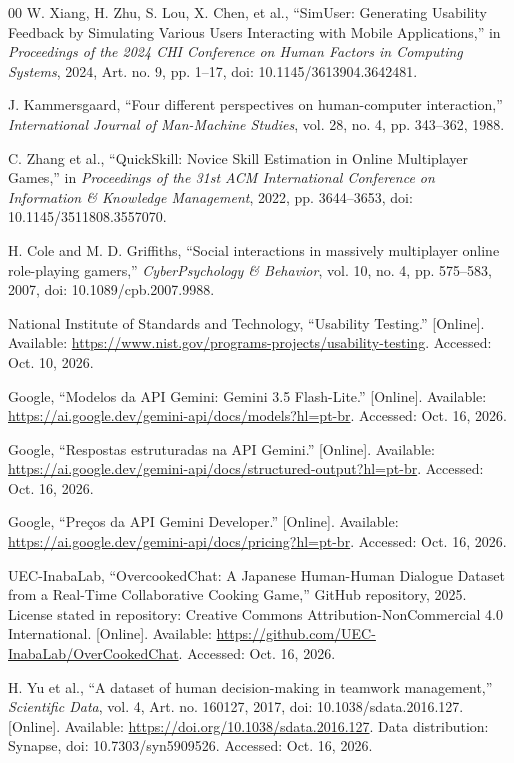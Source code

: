 \documentclass[conference]{IEEEtran}
\begin{document}
\begin{thebibliography}{00}
W. Xiang, H. Zhu, S. Lou, X. Chen, et al., ``SimUser: Generating Usability Feedback by Simulating Various Users Interacting with Mobile Applications,'' in \textit{Proceedings of the 2024 CHI Conference on Human Factors in Computing Systems}, 2024, Art. no. 9, pp. 1--17, doi: 10.1145/3613904.3642481.

J. Kammersgaard, ``Four different perspectives on human-computer interaction,'' \textit{International Journal of Man-Machine Studies}, vol. 28, no. 4, pp. 343--362, 1988.


C. Zhang et al., ``QuickSkill: Novice Skill Estimation in Online Multiplayer Games,'' in \textit{Proceedings of the 31st ACM International Conference on Information \& Knowledge Management}, 2022, pp. 3644--3653, doi: 10.1145/3511808.3557070.

H. Cole and M. D. Griffiths, ``Social interactions in massively multiplayer online role-playing gamers,'' \textit{CyberPsychology \& Behavior}, vol. 10, no. 4, pp. 575--583, 2007, doi: 10.1089/cpb.2007.9988.

National Institute of Standards and Technology, ``Usability Testing.'' [Online]. Available: \url{https://www.nist.gov/programs-projects/usability-testing}. Accessed: Oct. 10, 2026.

Google, ``Modelos da API Gemini: Gemini 3.5 Flash-Lite.'' [Online]. Available: \url{https://ai.google.dev/gemini-api/docs/models?hl=pt-br}. Accessed: Oct. 16, 2026.

Google, ``Respostas estruturadas na API Gemini.'' [Online]. Available: \url{https://ai.google.dev/gemini-api/docs/structured-output?hl=pt-br}. Accessed: Oct. 16, 2026.

Google, ``Preços da API Gemini Developer.'' [Online]. Available: \url{https://ai.google.dev/gemini-api/docs/pricing?hl=pt-br}. Accessed: Oct. 16, 2026.

UEC-InabaLab, ``OvercookedChat: A Japanese Human-Human Dialogue Dataset from a Real-Time Collaborative Cooking Game,'' GitHub repository, 2025. License stated in repository: Creative Commons Attribution-NonCommercial 4.0 International. [Online]. Available: \url{https://github.com/UEC-InabaLab/OverCookedChat}. Accessed: Oct. 16, 2026.

H. Yu et al., ``A dataset of human decision-making in teamwork management,'' \textit{Scientific Data}, vol. 4, Art. no. 160127, 2017, doi: 10.1038/sdata.2016.127. [Online]. Available: \url{https://doi.org/10.1038/sdata.2016.127}. Data distribution: Synapse, doi: 10.7303/syn5909526. Accessed: Oct. 16, 2026.


\end{thebibliography}
\end{document}
